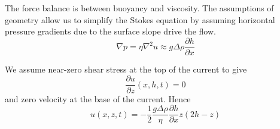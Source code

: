 \documentclass[10pt]{article}
\begin{document}
		The force
		balance is between buoyancy and viscosity. The assumptions of geometry allow us
		to simplify the Stokes equation by assuming horizontal pressure gradients due to the 
		surface slope drive the flow.
			\begin{equation}
				\nabla p = \eta\nabla^2 u \approx   g \Delta \rho \frac{\partial h}{\partial x}  
			\end{equation}
		
		We assume near-zero shear stress at the top of the current to give
			\begin{equation}
				\frac{\partial u}{\partial z} (x,h,t) = 0
			\end{equation}
		and zero velocity at the base of the current.
		Hence	
			\begin{equation}
				u(x,z,t) = -\frac{1}{2} \frac{g \Delta \rho}{\eta} \frac{\partial h}{\partial x}  z(2h-z)
			\end{equation}
		
\end{document}
